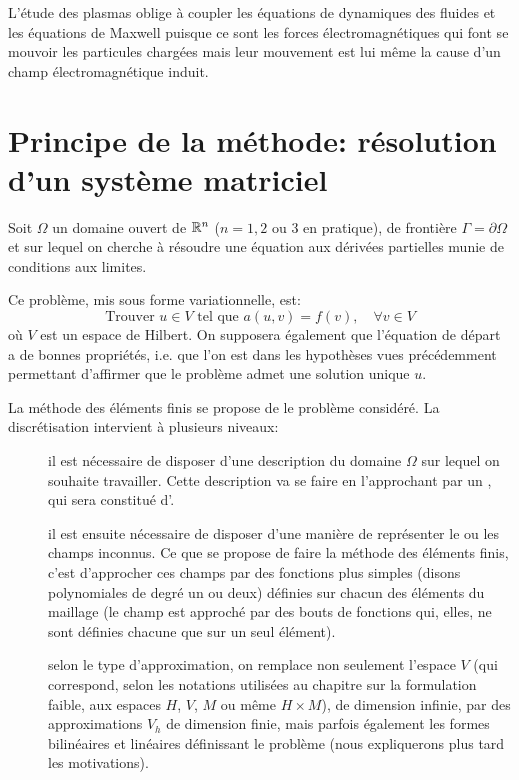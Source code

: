 L'étude des plasmas oblige à coupler les équations de dynamiques des fluides et les équations de Maxwell puisque ce sont les forces électromagnétiques qui font se mouvoir les particules chargées mais leur mouvement est lui même la cause d'un champ électromagnétique induit.

\medskip
\section{Principe de la méthode: résolution d'un système matriciel}\label{Sec-mesh-carac}

Soit $\Omega$ un domaine ouvert de $\mathbb R^n$ ($n = 1, 2$ ou $3$ en pratique), de frontière $\Gamma=\partial\Omega$ et sur lequel on cherche à résoudre une équation aux dérivées partielles munie de conditions aux limites.

\medskip
Ce problème, mis sous forme variationnelle, est:
\begin{equation}\label{Eq-P}
\text{Trouver } u\in V \text{ tel que } a(u,v) = f(v),\quad \forall v\in V
\end{equation}
où $V$ est un espace de Hilbert. On supposera également que l'équation de départ a de bonnes propriétés, i.e. que l'on est dans les hypothèses vues précédemment permettant d'affirmer que le problème admet une solution unique $u$.

\medskip
La méthode des éléments finis se propose de  le problème considéré. La discrétisation intervient à plusieurs niveaux:
\begin{description}
  \item[]
	il est nécessaire de disposer d'une description du domaine $\Omega$ sur lequel 	on souhaite travailler. Cette description va se faire en l'approchant par 	un , qui sera constitué d'.
  \item[]
	il est ensuite nécessaire de disposer d'une manière de représenter le ou les champs inconnus. Ce que se propose de faire la méthode des éléments finis, c'est d'approcher 	ces champs par des fonctions plus simples (disons polynomiales de degré un ou deux) définies sur chacun des éléments du maillage (le champ est approché par des bouts de fonctions qui, elles, ne sont définies chacune que sur un seul élément).
  \item[]
	selon le type d'approximation, on remplace non seulement l'espace $V$ (qui correspond, selon les notations utilisées au chapitre sur la formulation faible, aux espaces $H$, $V$, $M$ ou même $H\times M$), de dimension infinie, par des approximations $V_h$ de dimension finie, mais parfois également les formes bilinéaires et linéaires définissant le problème (nous expliquerons plus tard les motivations).
\end{description}

